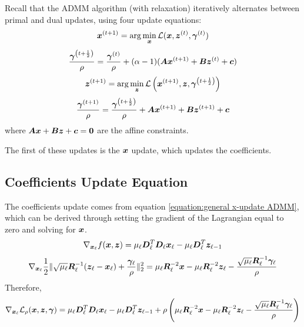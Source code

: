 Recall that the ADMM algorithm (with relaxation) iteratively alternates between primal and dual updates, using four update equations:
\begin{equation} \label{equation:general x-update ADMM}
\bm{x}^{(t + 1)} = \arg\min_{\bm{x}} \mathcal{L}(\bm{x},\bm{z}^{(t)},\bm{\gamma}^{(t)})
\end{equation}
%
\begin{equation}
\frac{\bm{\gamma}^{\left(t + \frac{1}{2}\right)}}{\rho} = \frac{\bm{\gamma}^{(t)}}{\rho} + (\alpha - 1)(\bm{A}\bm{x}^{(t + 1)} + \bm{B}\bm{z}^{(t)} + \bm{c})
\end{equation}
%
\begin{equation} \label{equation:general y-update ADMM}
\bm{z}^{(t + 1)} = \arg\min_{\bm{z}} \mathcal{L}\left(\bm{x}^{(t + 1)},\bm{z},\bm{\gamma}^{\left(t + \frac{1}{2}\right)}\right)
\end{equation}
%
\begin{equation}
\frac{\bm{\gamma}^{(t + 1)}}{\rho} = \frac{\bm{\gamma}^{\left(t + \frac{1}{2}\right)}}{\rho} + \bm{A}\bm{x}^{(t + 1)} + \bm{B}\bm{z}^{(t + 1)} + \bm{c}
\end{equation}
%
where $\bm{A}\bm{x} + \bm{B}\bm{z} + \bm{c} = \bm{0}$ are the affine constraints.

The first of these updates is the $\bm{x}$ update, which updates the coefficients.


\subsection{Coefficients Update Equation}
The coefficients update comes from equation \ref{equation:general x-update ADMM}, which can be derived through setting the gradient of the Lagrangian equal to zero and solving for $\bm{x}$.
%
\begin{equation}
\nabla_{\bm{x}_{\ell}} f(\bm{x},\bm{z}) = \mu_{\ell}\bm{D}_{\ell}^T\bm{D}_{\ell}\bm{x}_{\ell} - \mu_{\ell}\bm{D}_{\ell}^T\bm{z}_{\ell - 1}
\end{equation}
%
\begin{equation}
\nabla_{\bm{x}_{\ell}} \frac{1}{2}\|\sqrt{\mu_{\ell}}\bm{R}_{\ell}^{-1}(\bm{z}_{\ell} - \bm{x}_{\ell}) + \frac{\bm{\gamma}_{\ell}}{\rho}\|_2^2 = \mu_{\ell}\bm{R}_{\ell}^{-2}\bm{x} - \mu_{\ell}\bm{R}_{\ell}^{-2}\bm{z}_{\ell} - \frac{\sqrt{\mu_{\ell}}\bm{R}_{\ell}^{-1}\bm{\gamma}_{\ell}}{\rho}
\end{equation}
%
Therefore,
%
\begin{equation}
\nabla_{\bm{x}_{\ell}} \mathcal{L}_{\rho}(\bm{x},\bm{z},\bm{\gamma}) = \mu_{\ell}\bm{D}_{\ell}^T\bm{D}_{\ell}\bm{x}_{\ell} - \mu_{\ell}\bm{D}_{\ell}^T\bm{z}_{\ell - 1} + \rho\left(\mu_{\ell}\bm{R}_{\ell}^{-2}\bm{x} - \mu_{\ell}\bm{R}_{\ell}^{-2}\bm{z}_{\ell} - \frac{\sqrt{\mu_{\ell}}\bm{R}_{\ell}^{-1}\bm{\gamma}_{\ell}}{\rho}\right)
\end{equation}

